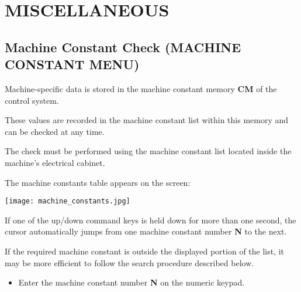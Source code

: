 \chapter{MISCELLANEOUS}

\section{Machine Constant Check (MACHINE CONSTANT MENU)}

Machine-specific data is stored in the machine constant memory \textbf{CM} of the control system.

These values are recorded in the machine constant list within this memory and can be checked at any time.

The check must be performed using the machine constant list located inside the machine's electrical cabinet.

\procedure

\begin{itemize}
\end{itemize}

\vspace{.5cm}

\begin{itemize}
\end{itemize}

The machine constants table appears on the screen:

\begin{center}
    \texttt{[image: machine\_constants.jpg]}
\end{center}

\begin{itemize}
\end{itemize}

If one of the up/down command keys is held down for more than one second, the cursor automatically jumps from one machine constant number \textbf{N} to the next.

If the required machine constant is outside the displayed portion of the list, it may be more efficient to follow the search procedure described below.

\newpage

\begin{itemize}
    \item Enter the machine constant number \textbf{N} on the numeric keypad.
\end{itemize}


